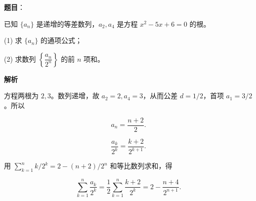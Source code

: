 \begin{answer}

\textbf{题目}：

已知 $\{a_n\}$ 是递增的等差数列，$a_2,a_4$ 是方程 $x^2-5x+6=0$ 的根。

(1) 求 $\{a_n\}$ 的通项公式；

(2) 求数列 $\left\{\dfrac{a_n}{2^n}\right\}$ 的前 $n$ 项和。

\textbf{解析}


方程两根为 $2,3$。数列递增，故 $a_2=2,a_4=3$，从而公差 $d=1/2$，首项 $a_1=3/2$。所以

\nopagebreak[4]
\[
a_n=\frac{n+2}{2}.
\]


\nopagebreak[4]
\[
\frac{a_k}{2^k}=\frac{k+2}{2^{k+1}}.
\]

用 $\sum_{k=1}^n k/2^k=2-(n+2)/2^n$ 和等比数列求和，得

\nopagebreak[4]
\[
\sum_{k=1}^n\frac{a_k}{2^k}
=\frac12\sum_{k=1}^n\frac{k+2}{2^k}
=2-\frac{n+4}{2^{n+1}}.
\]



\end{answer}
